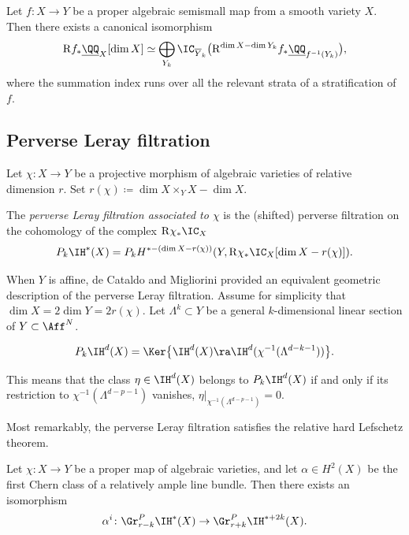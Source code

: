 \begin{thm}\label{DecThm}
Let $f\colon X \to Y$ be a proper algebraic semismall map from a smooth variety $X$. Then there exists a canonical isomorphism
\[
\mathrm{R}f_* \underline{\QQ}_X [\dim X] \simeq \bigoplus_{Y_k} \IC_{\overline{Y}_k}\big(\mathrm{R}^{\dim X - \dim Y_k}f_*\underline{\QQ}_{f^{-1}(Y_k)}\big),
\]
where the summation index runs over all the relevant strata of a stratification of $f$.
\end{thm}
\subsection{Perverse Leray filtration}\label{sec:perverseleray}
Let $\chi\colon X\to Y$ be a projective morphism of algebraic varieties of relative dimension $r$. Set $r(\chi) \coloneqq \dim X \times_Y X - \dim X$.
\begin{defn}\label{Def:perverseLeray}
The \emph{perverse Leray filtration associated to $\chi$} is the (shifted) perverse filtration on the cohomology of the complex $\mathrm{R}\chi_*\IC_X$
\[
P_k \IH^*(X)=P_k H^{*-(\dim X -r(\chi))}(Y,\mathrm{R}\chi_*\IC_X[\dim X -r(\chi)]).
\]
\end{defn}

When $Y$ is affine, de Cataldo and Migliorini provided an equivalent geometric description of the perverse Leray filtration.
Assume for simplicity that
$\dim X = 2\dim Y = 2 r(\chi)$. Let $\Lambda^k\subset Y$ be a general $k$-dimensional linear section of $Y\subset \Aff^N$.

\skpt
\begin{thm}\label{thm:kercharacterizationp}\mbox{}\vspace*{-.7\baselineskip}
\[
P_k \IH^d(X)=\Ker\bigl\lbrace \IH^d(X)\ra \IH^d(\chi^{-1}(\Lambda^{d-k-1}))
\bigr \rbrace.
\]
\end{thm}
This means that the class $\eta \in \IH^d(X)$ belongs to $P_k\IH^d(X)$ if and only if its restriction to $\chi^{-1}(\Lambda^{d-p-1})$ vanishes, \ie $\eta|_{ \chi^{-1}(\Lambda^{d-p-1})}=0$.

Most remarkably, the perverse Leray filtration satisfies the relative hard Lefschetz theorem.
\begin{thm}\label{thm:rhl}
Let $\chi\colon X\to Y$ be a proper map of algebraic varieties, and let $\alpha\in H^2(X)$ be the first Chern class of a relatively ample line bundle. Then there exists an isomorphism
\[
\alpha^i\colon \Gr^P_{r-k}\IH^*(X)\to \Gr^P_{r+k}\IH^{*+2k}(X).
\]
\end{thm}

